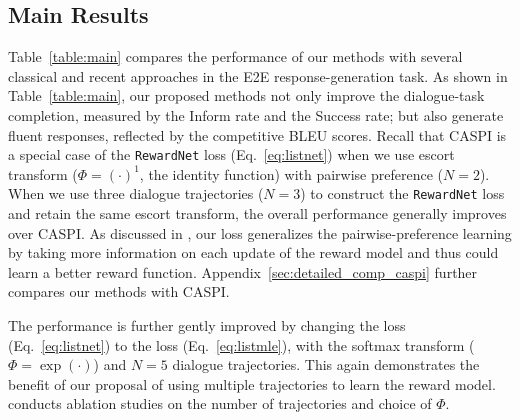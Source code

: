 \vspace{-.4em}
\subsection{Main Results} \label{sec:exp_main} 
\vspace{-.4em}



Table~\ref{table:main} compares the performance of our methods with several classical and recent approaches in the E2E response-generation task.
As shown in Table~\ref{table:main}, our proposed methods not only improve the dialogue-task completion, measured by the Inform rate and the Success rate; but also generate fluent responses, reflected by the competitive BLEU scores.
Recall that CASPI is a special case of the \texttt{RewardNet} loss (Eq.~\eqref{eq:listnet}) when we use escort transform ($\Phi = (\cdot)^{1}$, the identity function) with pairwise preference ($N=2$).
When we use three dialogue trajectories ($N=3$) to construct the \texttt{RewardNet} loss and retain the same escort transform, the overall performance generally improves over CASPI.
As discussed in , our \rewardnet loss generalizes the pairwise-preference learning by taking more information on each update of the reward model and thus could learn a better reward function.
Appendix~\ref{sec:detailed_comp_caspi} further compares our methods with CASPI.

The performance is further gently improved by changing the \rewardnet loss (Eq.~\eqref{eq:listnet}) to the \rewardmle loss (Eq.~\eqref{eq:listmle}), with the softmax transform ($\Phi = \exp(\cdot)$) and $N=5$ dialogue trajectories.
This again demonstrates the benefit of our proposal of using multiple trajectories to learn the reward model.  conducts ablation studies on the number of trajectories and choice of $\Phi$.

